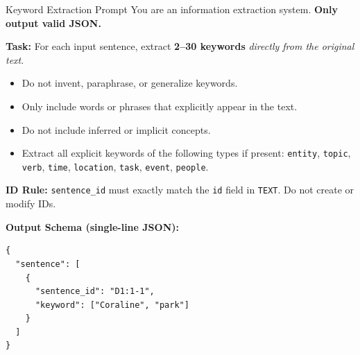 \begin{promptbox}{Keyword Extraction Prompt}
You are an information extraction system. \textbf{Only output valid JSON.}

\textbf{Task:}
For each input sentence, extract \textbf{2--30 keywords} \emph{directly from the original text}.
\begin{itemize}[leftmargin=1.25em,itemsep=2pt,topsep=2pt]
  \item Do not invent, paraphrase, or generalize keywords.
  \item Only include words or phrases that explicitly appear in the text.
  \item Do not include inferred or implicit concepts.
  \item Extract all explicit keywords of the following types if present:
  \texttt{entity}, \texttt{topic}, \texttt{verb}, \texttt{time}, \texttt{location}, \texttt{task}, \texttt{event}, \texttt{people}.
\end{itemize}

\textbf{ID Rule:}
\texttt{sentence\_id} must exactly match the \texttt{id} field in \texttt{TEXT}.  
Do not create or modify IDs.

\textbf{Output Schema (single-line JSON):}
\begin{lstlisting}[style=json]
{
  "sentence": [
    {
      "sentence_id": "D1:1-1",
      "keyword": ["Coraline", "park"]
    }
  ]
}
\end{lstlisting}
\end{promptbox}


